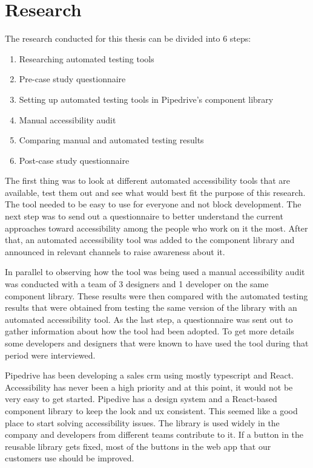 \documentclass{master_thesis}
\begin{document}
\section{Research}

The research conducted for this thesis can be divided into 6 steps:

\begin{enumerate}
	\item Researching automated testing tools
	\item Pre-case study questionnaire
	\item Setting up automated testing tools in Pipedrive's component library
	\item Manual accessibility audit
	\item Comparing manual and automated testing results
	\item Post-case study questionnaire
\end{enumerate}

The first thing was to look at different automated accessibility tools that are available, test them out and see what would best fit the purpose of this research. The tool needed to be easy to use for everyone and not block development. The next step was to send out a questionnaire to better understand the current approaches toward accessibility among the people who work on it the most. After that, an automated accessibility tool was added to the component library and announced in relevant channels to raise awareness about it.

In parallel to observing how the tool was being used a manual accessibility audit was conducted with a team of 3 designers and 1 developer on the same component library. These results were then compared with the automated testing results that were obtained from testing the same version of the library with an automated accessibility tool. As the last step, a questionnaire was sent out to gather information about how the tool had been adopted. To get more details some developers and designers that were known to have used the tool during that period were interviewed.

Pipedrive has been developing a sales \ac{crm} using mostly typescript and React. Accessibility has never been a high priority and at this point, it would not be very easy to get started. Pipedive has a design system and a React-based component library to keep the look and \ac{ux} consistent. This seemed like a good place to start solving accessibility issues. The library is used widely in the company and developers from different teams contribute to it. If a button in the reusable library gets fixed, most of the buttons in the web app that our customers use should be improved.
\end{document}
